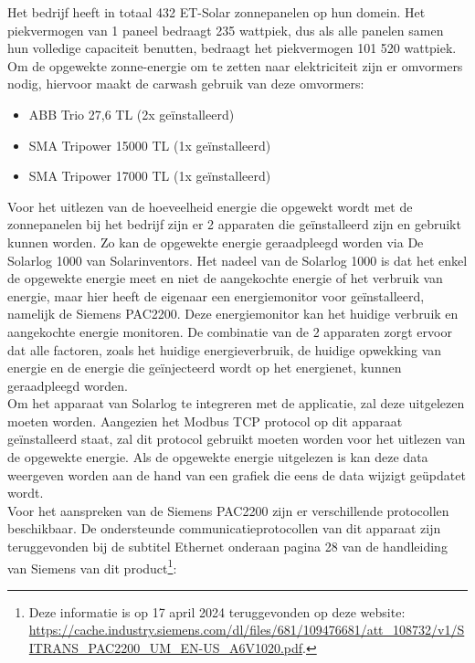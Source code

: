 Het bedrijf heeft in totaal 432 ET-Solar zonnepanelen op hun domein. Het piekvermogen van 1 paneel bedraagt 235 wattpiek, dus als alle panelen samen hun volledige capaciteit benutten, bedraagt het piekvermogen 101 520 wattpiek. Om de opgewekte zonne-energie om te zetten naar elektriciteit zijn er omvormers nodig, hiervoor maakt de carwash gebruik van deze omvormers:

\begin{itemize}
    \item ABB Trio 27,6 TL (2x geïnstalleerd)
    \item SMA Tripower 15000 TL (1x geïnstalleerd)
    \item SMA Tripower 17000 TL (1x geïnstalleerd)
\end{itemize}

Voor het uitlezen van de hoeveelheid energie die opgewekt wordt met de zonnepanelen bij het bedrijf zijn er 2 apparaten die geïnstalleerd zijn en gebruikt kunnen worden. Zo kan de opgewekte energie geraadpleegd worden via De Solarlog 1000 van Solarinventors. Het nadeel van de Solarlog 1000 is dat het enkel de opgewekte energie meet en niet de aangekochte energie of het verbruik van energie, maar hier heeft de eigenaar een energiemonitor voor geïnstalleerd, namelijk de Siemens PAC2200. Deze energiemonitor kan het huidige verbruik en aangekochte energie monitoren. De combinatie van de 2 apparaten zorgt ervoor dat alle factoren, zoals het huidige energieverbruik, de huidige opwekking van energie en de energie die geïnjecteerd wordt op het energienet, kunnen geraadpleegd worden.\\

Om het apparaat van Solarlog te integreren met de applicatie, zal deze uitgelezen moeten worden. Aangezien het Modbus TCP protocol op dit apparaat geïnstalleerd staat, zal dit protocol gebruikt moeten worden voor het uitlezen van de opgewekte energie. Als de opgewekte energie uitgelezen is kan deze data weergeven worden aan de hand van een grafiek die eens de data wijzigt geüpdatet wordt.\\

Voor het aanspreken van de Siemens PAC2200 zijn er verschillende protocollen beschikbaar. De ondersteunde communicatieprotocollen van dit apparaat zijn teruggevonden bij de subtitel Ethernet onderaan pagina 28 van de handleiding van Siemens van dit product\footnote{Deze informatie is op 17 april 2024 teruggevonden op deze website: \url{https://cache.industry.siemens.com/dl/files/681/109476681/att_108732/v1/SITRANS_PAC2200_UM_EN-US_A6V1020.pdf}.}:

